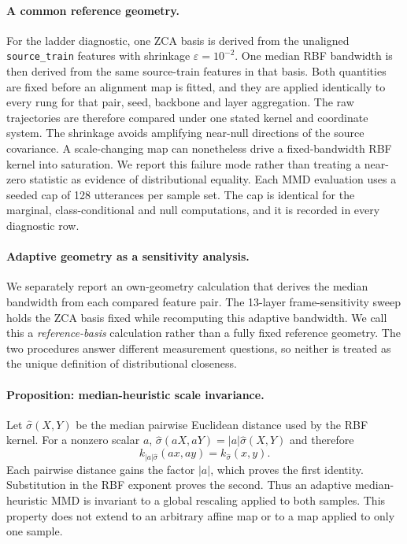 \paragraph{A common reference geometry.} For the ladder diagnostic, one ZCA
basis is derived from the unaligned \texttt{source\_train} features with
shrinkage $\varepsilon = 10^{-2}$. One median RBF bandwidth is then derived from
the same source-train features in that basis. Both quantities are fixed before
an alignment map is fitted, and they are applied identically to every rung for
that pair, seed, backbone and layer aggregation. The raw trajectories are
therefore compared under one stated kernel and coordinate system. The shrinkage
avoids amplifying near-null directions of the source covariance. A
scale-changing map can nonetheless drive a fixed-bandwidth RBF kernel into
saturation. We report this failure mode rather than treating a near-zero
statistic as evidence of distributional equality. Each MMD evaluation uses a
seeded cap of 128 utterances per sample set. The cap is identical for the
marginal, class-conditional and null computations, and it is recorded in every
diagnostic row.

\paragraph{Adaptive geometry as a sensitivity analysis.} We separately report
an own-geometry calculation that derives the median bandwidth from each
compared feature pair. The 13-layer frame-sensitivity sweep holds the ZCA basis
fixed while recomputing this adaptive bandwidth. We call this a
\emph{reference-basis} calculation rather than a fully fixed reference
geometry. The two procedures answer different measurement questions, so
neither is treated as the unique definition of distributional closeness.

\paragraph{Proposition: median-heuristic scale invariance.} Let
$\hat\sigma(X,Y)$ be the median pairwise Euclidean distance used by the RBF
kernel. For a nonzero scalar $a$,
$\hat\sigma(aX,aY)=|a|\hat\sigma(X,Y)$ and therefore
\begin{equation}
  k_{|a|\hat\sigma}(ax,ay)=k_{\hat\sigma}(x,y).
  \label{eq:median-scale-invariance}
\end{equation}
Each pairwise distance gains the factor $|a|$, which proves the first identity.
Substitution in the RBF exponent proves the second. Thus an adaptive
median-heuristic MMD is invariant to a global rescaling applied to both
samples. This property does not extend to an arbitrary affine map or to a map
applied to only one sample.

